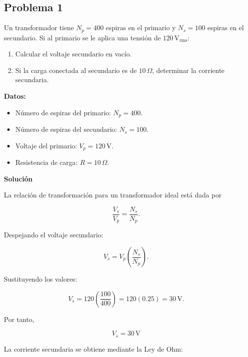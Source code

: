 \subsection{Problema 1}

 Un transformador tiene $N_p = 400$ espiras en el primario y $N_s = 100$ espiras en el secundario. Si al primario se le aplica una tensión de $120\,\mathrm{V_{rms}}$:

\begin{enumerate}
    \item Calcular el voltaje secundario en vacío.
    \item Si la carga conectada al secundario es de $10\,\Omega$, determinar la corriente secundaria.
\end{enumerate}

\textbf{Datos:}

\begin{itemize}
    \item Número de espiras del primario: $N_p = 400$.
    \item Número de espiras del secundario: $N_s = 100$.
    \item Voltaje del primario: $V_p = 120\,\mathrm{V}$.
    \item Resistencia de carga: $R = 10\,\Omega$.
\end{itemize}

\textbf{Solución}

La relación de transformación para un transformador ideal está dada por

\begin{equation}
\frac{V_s}{V_p}=\frac{N_s}{N_p}.
\end{equation}

Despejando el voltaje secundario:

\begin{equation}
V_s = V_p\left(\frac{N_s}{N_p}\right).
\end{equation}

Sustituyendo los valores:

\begin{equation}
V_s = 120\left(\frac{100}{400}\right)
=120(0.25)
=30\,\mathrm{V}.
\end{equation}

Por tanto,

\begin{equation}
\boxed{V_s = 30\,\mathrm{V}}
\end{equation}

La corriente secundaria se obtiene mediante la Ley de Ohm:


